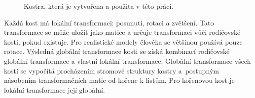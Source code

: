 \begin{figure}[h]
\begin{center}
\caption{Kostra, která je vytvořena a použita v této práci.} \label{bone_structure}
\end{center}
\end{figure}

Každá kost má lokální transformaci: posunutí, rotaci a zvětšení. Tato transformace se může uložit jako matice a určuje transformaci vůči rodičovské kosti, pokud existuje. Pro realistické modely člověka se většinou používá pouze rotace. Výsledná globální transformace kosti se získá kombinací rodičovské globální transformace a vlastní lokální transformace. Globální transformace všech kostí se vypočítá procházením stromové struktury kostry a~postupným násobením transformačních matic od kořene k listům. Pro kořenovou kost je lokální transformace její globální. 

